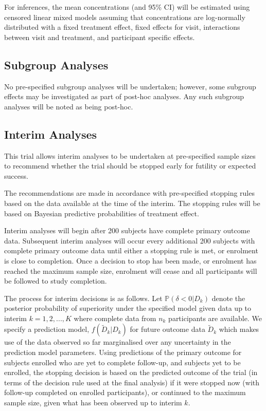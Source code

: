 \documentclass{bmcart}
\begin{document}
For inferences, the mean concentrations (and 95\% CI) will be estimated using censored linear mixed models assuming that concentrations are log-normally distributed with a fixed treatment effect, fixed effects for visit, interactions between visit and treatment, and participant specific effects.


\subsection*{Subgroup Analyses}

No pre-specified subgroup analyses will be undertaken; however, some subgroup effects may be investigated as part of post-hoc analyses.
Any such subgroup analyses will be noted as being post-hoc.

\subsection*{Interim Analyses}

This trial allows interim analyses to be undertaken at pre-specified sample sizes to recommend whether the trial should be stopped early for futility or expected success.

The recommendations are made in accordance with pre-specified stopping rules based on the data available at the time of the interim.
The stopping rules will be based on Bayesian predictive probabilities of treatment effect.

Interim analyses will begin after 200 subjects have complete primary outcome data.
Subsequent interim analyses will occur every additional 200 subjects with complete primary outcome data until either a stopping rule is met, or enrolment is close to completion.
Once a decision to stop has been made, or enrolment has reached the maximum sample size, enrolment will cease and all participants will be followed to study completion.

The process for interim decisions is as follows.
Let $\mathbb P(\delta < 0|D_k)$ denote the posterior probability of superiority under the specified model given data up to interim $k=1,2,...,K$ where complete data from $n_k$ participants are available.
We specify a prediction model, $f(\tilde D_k|D_k)$ for future outcome data $\tilde D_k$ which makes use of the data observed so far marginalised over any uncertainty in the prediction model parameters.
Using predictions of the primary outcome for subjects enrolled who are yet to complete follow-up, and subjects yet to be enrolled, the stopping decision is based on the predicted outcome of the trial (in terms of the decision rule used at the final analysis) if it were stopped now (with follow-up completed on enrolled participants), or continued to the maximum sample size, given what has been observed up to interim $k$.
\end{document}
